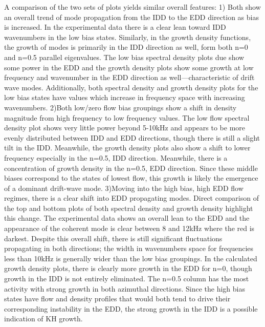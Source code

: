\documentclass[aip,pop,amsmath,amssymb,reprint,superscriptaddress]{revtex4-1} %
\begin{document}
A comparison of the two sets of plots yields similar overall features: 1) Both show an overall trend of mode propagation from the IDD to the EDD direction as bias is increased. In the experimental data there is a clear lean toward IDD wavenumbers in the low bias states. Similarly, in the growth density functions, the growth of modes is primarily in the IDD direction as well, form both n=0 and n=0.5 parallel eigenvalues. The low bias spectral density plots due show some power in the EDD and the growth density plots show some growth at low frequency and wavenumber in the EDD direction as well---characteristic of drift wave modes. Additionally, both spectral density and growth density plots for the low bias states have values which increase in frequency space with increasing wavenumbers. 2)Both low/zero flow bias groupings show a shift in density magnitude from high frequency to low frequency values. The low flow spectral density plot shows very little power beyond 5-10kHz and appears to be more evenly distributed between IDD and EDD directions, though there is still a slight tilt in the IDD. Meanwhile, the growth density plots also show a shift to lower frequency especially in the n=0.5, IDD direction. Meanwhile, there is a concentration of growth density in the n=0.5, EDD direction. Since these middle biases correspond to the states of lowest flow, this growth is likely the emergence of a dominant drift-wave mode. 3)Moving into the high bias, high EDD flow regimes, there is a clear shift into EDD propagating modes. Direct comparison of the top and bottom plots of both spectral density and growth density highlight this change. The experimental data shows an overall lean to the EDD and the appearance of the coherent mode is clear between 8 and 12kHz where the red is darkest. Despite this overall shift, there is still significant fluctuations propagating in both directions; the width in wavenumbers space for frequencies less than 10kHz is generally wider than the low bias groupings. In the calculated growth density plots, there is clearly more growth in the EDD for n=0, though growth in the IDD is not entirely eliminated. The n=0.5 column has the most activity with strong growth in both azimuthal directions. Since the high bias states have flow and density profiles that would both tend to drive their corresponding instability in the EDD, the strong growth in the IDD is a possible indication of KH growth.
\end{document}
